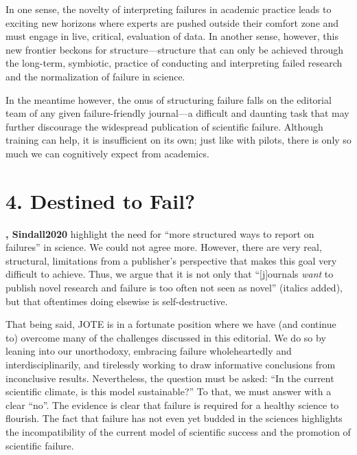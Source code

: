 \documentclass{article}
\begin{document}
In one sense, the novelty of interpreting failures in academic practice leads to exciting new horizons where experts are pushed outside their comfort zone and must engage in live, critical, evaluation of data. In another sense, however, this new frontier beckons for structure—structure that can only be achieved through the long-term, symbiotic, practice of conducting and interpreting failed research and the normalization of failure in science.

In the meantime however, the onus of structuring failure falls on the editorial team of any given failure-friendly journal—a difficult and daunting task that may further discourage the widespread publication of scientific failure. Although training can help, it is insufficient on its own; just like with pilots, there is only so much we can cognitively expect from academics. 

\section{}

\section{4\textbf{. }\textbf{Destined to Fail?}}

\textbf{, Sindall2020} highlight the need for “more structured ways to report on failures” in science. We could not agree more. However, there are very real, structural, limitations from a publisher's perspective that makes this goal very difficult to achieve. Thus, we argue that it is not only that “[j]ournals \emph{want} to publish novel research and failure is too often not seen as novel” (italics added), but that oftentimes doing elsewise is self-destructive. 

That being said, JOTE is in a fortunate position where we have (and continue to) overcome many of the challenges discussed in this editorial. We do so by leaning into our unorthodoxy, embracing failure wholeheartedly and interdisciplinarily, and tirelessly working to draw informative conclusions from inconclusive results. Nevertheless, the question must be asked: “In the current scientific climate, is this model sustainable?” To that, we must answer with a clear “no”. The evidence is clear that failure is required for a healthy science to flourish. The fact that failure has not even yet budded in the sciences highlights the incompatibility of the current model of scientific success and the promotion of scientific failure. 
\end{document}
